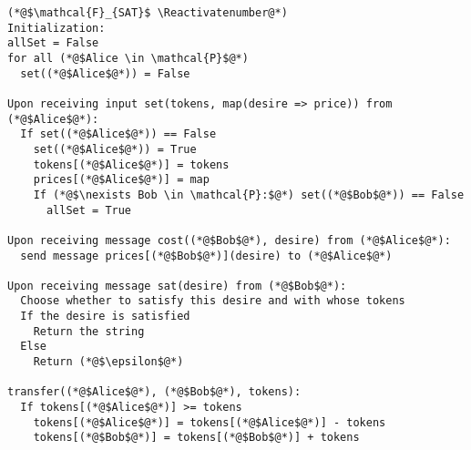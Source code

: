 \Suppressnumber
\begin{lstlisting}[label=satfunc, style=numbers]
(*@$\mathcal{F}_{SAT}$ \Reactivatenumber@*)
Initialization:
allSet = False
for all (*@$Alice \in \mathcal{P}$@*)
  set((*@$Alice$@*)) = False

Upon receiving input set(tokens, map(desire => price)) from (*@$Alice$@*):
  If set((*@$Alice$@*)) == False
    set((*@$Alice$@*)) = True
    tokens[(*@$Alice$@*)] = tokens
    prices[(*@$Alice$@*)] = map
    If (*@$\nexists Bob \in \mathcal{P}:$@*) set((*@$Bob$@*)) == False
      allSet = True

Upon receiving message cost((*@$Bob$@*), desire) from (*@$Alice$@*):
  send message prices[(*@$Bob$@*)](desire) to (*@$Alice$@*)

Upon receiving message sat(desire) from (*@$Bob$@*):
  Choose whether to satisfy this desire and with whose tokens
  If the desire is satisfied
    Return the string
  Else
    Return (*@$\epsilon$@*)

transfer((*@$Alice$@*), (*@$Bob$@*), tokens):
  If tokens[(*@$Alice$@*)] >= tokens
    tokens[(*@$Alice$@*)] = tokens[(*@$Alice$@*)] - tokens
    tokens[(*@$Bob$@*)] = tokens[(*@$Bob$@*)] + tokens
\end{lstlisting}
